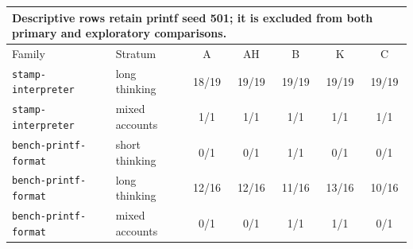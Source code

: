 \begin{tabular}{llccccc}
\toprule
\multicolumn{7}{l}{\footnotesize Descriptive rows retain printf seed 501; it is excluded from both primary and exploratory comparisons.} \\
\midrule
Family & Stratum & A & AH & B & K & C \\
\midrule
\texttt{stamp-interpreter} & long thinking & 18/19 & 19/19 & 19/19 & 19/19 & 19/19 \\
\texttt{stamp-interpreter} & mixed accounts & 1/1 & 1/1 & 1/1 & 1/1 & 1/1 \\
\texttt{bench-printf-format} & short thinking & 0/1 & 0/1 & 1/1 & 0/1 & 0/1 \\
\texttt{bench-printf-format} & long thinking & 12/16 & 12/16 & 11/16 & 13/16 & 10/16 \\
\texttt{bench-printf-format} & mixed accounts & 0/1 & 0/1 & 1/1 & 1/1 & 0/1 \\
\bottomrule
\end{tabular}
